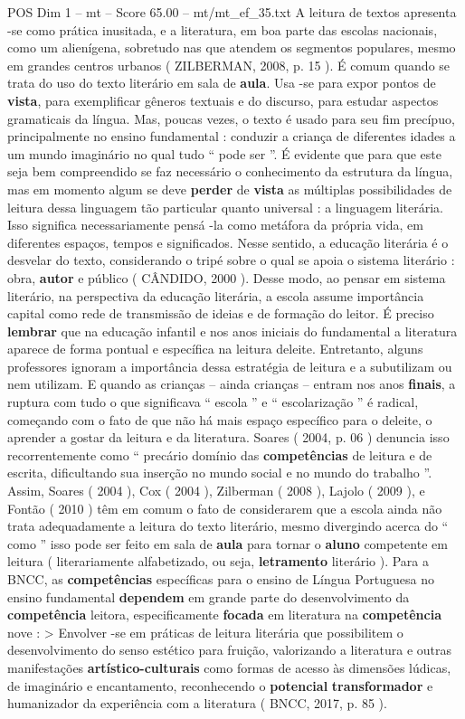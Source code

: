 \begin{textsample}{POS Dim 1 – mt – Score 65.00 – mt/mt\_ef\_35.txt}
A leitura de textos apresenta -se como prática inusitada, e a literatura, em boa parte das escolas nacionais, como um alienígena, sobretudo nas que atendem os segmentos populares, mesmo em grandes centros urbanos ( ZILBERMAN, 2008, p. 15 ).
É comum quando se trata do uso do texto literário em sala de \textbf{aula}.
Usa -se para expor pontos de \textbf{vista}, para exemplificar gêneros textuais e do discurso, para estudar aspectos gramaticais da língua.
Mas, poucas vezes, o texto é usado para seu fim precípuo, principalmente no ensino fundamental : conduzir a criança de diferentes idades a um mundo imaginário no qual tudo “ pode ser ”.
É evidente que para que este seja bem compreendido se faz necessário o conhecimento da estrutura da língua, mas em momento algum se deve \textbf{perder} de \textbf{vista} as múltiplas possibilidades de leitura dessa linguagem tão particular quanto universal : a linguagem literária.
Isso significa necessariamente pensá -la como metáfora da própria vida, em diferentes espaços, tempos e significados.
Nesse sentido, a educação literária é o desvelar do texto, considerando o tripé sobre o qual se apoia o sistema literário : obra, \textbf{autor} e público ( CÂNDIDO, 2000 ).
Desse modo, ao pensar em sistema literário, na perspectiva da educação literária, a escola assume importância capital como rede de transmissão de ideias e de formação do leitor.
É preciso \textbf{lembrar} que na educação infantil e nos anos iniciais do fundamental a literatura aparece de forma pontual e específica na leitura deleite.
Entretanto, alguns professores ignoram a importância dessa estratégia de leitura e a subutilizam ou nem utilizam.
E quando as crianças – ainda crianças – entram nos anos \textbf{finais}, a ruptura com tudo o que significava “ escola ” e “ escolarização ” é radical, começando com o fato de que não há mais espaço específico para o deleite, o aprender a gostar da leitura e da literatura.
Soares ( 2004, p. 06 ) denuncia isso recorrentemente como “ precário domínio das \textbf{competências} de leitura e de escrita, dificultando sua inserção no mundo social e no mundo do trabalho ”.
Assim, Soares ( 2004 ), Cox ( 2004 ), Zilberman ( 2008 ), Lajolo ( 2009 ), e Fontão ( 2010 ) têm em comum o fato de considerarem que a escola ainda não trata adequadamente a leitura do texto literário, mesmo divergindo acerca do “ como ” isso pode ser feito em sala de \textbf{aula} para tornar o \textbf{aluno} competente em leitura ( literariamente alfabetizado, ou seja, \textbf{letramento} literário ).
Para a BNCC, as \textbf{competências} específicas para o ensino de Língua Portuguesa no ensino fundamental \textbf{dependem} em grande parte do desenvolvimento da \textbf{competência} leitora, especificamente \textbf{focada} em literatura na \textbf{competência} nove : > Envolver -se em práticas de leitura literária que possibilitem o desenvolvimento do senso estético para fruição, valorizando a literatura e outras manifestações \textbf{artístico-culturais} como formas de acesso às dimensões lúdicas, de imaginário e encantamento, reconhecendo o \textbf{potencial} \textbf{transformador} e humanizador da experiência com a literatura ( BNCC, 2017, p. 85 ).

\end{textsample}
